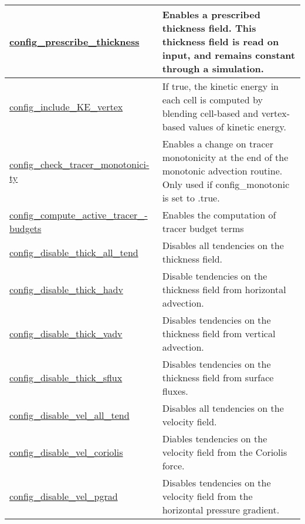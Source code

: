 {\begin{center}
\begin{longtable}{| p{2.0in} || p{4.0in} |}
    \hline
    \hyperref[subsec:nm_sec_config_prescribe_thickness]{config\_prescribe\_thickness} & Enables a prescribed thickness field. This thickness field is read on input, and remains constant through a simulation. \\
    \hline
    \hyperref[subsec:nm_sec_config_include_KE_vertex]{config\_include\_KE\_vertex} & If true, the kinetic energy in each cell is computed by blending cell-based and vertex-based values of kinetic energy. \\
    \hline
    \hyperref[subsec:nm_sec_config_check_tracer_monotonicity]{config\_check\_tracer\_monotonici-}\hyperref[subsec:nm_sec_config_check_tracer_monotonicity]{ty}& Enables a change on tracer monotonicity at the end of the monotonic advection routine. Only used if config\_monotonic is set to .true. \\
    \hline
    \hyperref[subsec:nm_sec_config_compute_active_tracer_budgets]{config\_compute\_active\_tracer\_-}\hyperref[subsec:nm_sec_config_compute_active_tracer_budgets]{budgets}& Enables the computation of tracer budget terms \\
    \hline
    \hyperref[subsec:nm_sec_config_disable_thick_all_tend]{config\_disable\_thick\_all\_tend} & Disables all tendencies on the thickness field. \\
    \hline
    \hyperref[subsec:nm_sec_config_disable_thick_hadv]{config\_disable\_thick\_hadv} & Disable tendencies on the thickness field from horizontal advection. \\
    \hline
    \hyperref[subsec:nm_sec_config_disable_thick_vadv]{config\_disable\_thick\_vadv} & Disables tendencies on the thickness field from vertical advection. \\
    \hline
    \hyperref[subsec:nm_sec_config_disable_thick_sflux]{config\_disable\_thick\_sflux} & Disables tendencies on the thickness field from surface fluxes. \\
    \hline
    \hyperref[subsec:nm_sec_config_disable_vel_all_tend]{config\_disable\_vel\_all\_tend} & Disables all tendencies on the velocity field. \\
    \hline
    \hyperref[subsec:nm_sec_config_disable_vel_coriolis]{config\_disable\_vel\_coriolis} & Diables tendencies on the velocity field from the Coriolis force. \\
    \hline
    \hyperref[subsec:nm_sec_config_disable_vel_pgrad]{config\_disable\_vel\_pgrad} & Disables tendencies on the velocity field from the horizontal pressure gradient. \\
    \hline

\end{longtable}
\end{center}}
